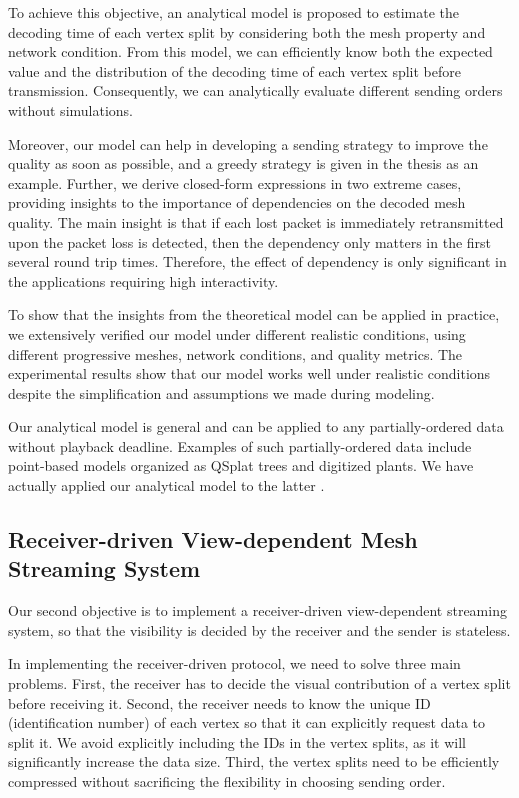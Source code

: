     To achieve this objective, an analytical model is proposed
    to estimate the decoding time of each vertex split by considering both
    the mesh property and network condition. 
    From this model, we can efficiently know both the expected 
    value and the distribution of the decoding time of each
    vertex split before transmission. Consequently, 
    we can analytically evaluate different sending orders without simulations.
    
    Moreover, our model can help in developing a sending
    strategy to improve the quality as soon as possible,
    and a greedy strategy is given in the thesis as an example. 
    Further, we derive closed-form expressions in two extreme cases,
    providing insights to the importance of dependencies on the
    decoded mesh quality. The main insight is that if each lost packet
    is immediately retransmitted upon the packet loss is detected, 
    then the dependency only matters in the first several round trip times. 
    Therefore, the effect of dependency is only significant in the applications
    requiring high interactivity. 

    To show that the insights from the theoretical model can be applied
    in practice, we extensively verified our model under different realistic conditions,
    using different progressive meshes, network conditions, and quality metrics. 
    The experimental results show that our model works well under realistic 
    conditions despite the simplification and assumptions we made during
    modeling.

    Our analytical model is general and can be applied to any 
    partially-ordered data without playback deadline.
    Examples of such partially-ordered data include point-based models 
    organized as QSplat trees \cite{rusinkiewicz:qsplat} and digitized plants.  
    We have actually applied our analytical model to the latter \cite{plant:seb}.
    
    \subsection{Receiver-driven View-dependent Mesh Streaming System}
    Our second objective is to implement a receiver-driven view-dependent streaming system,
    so that the visibility is decided by the receiver and the sender is stateless.
    
    In implementing the receiver-driven protocol, we need to solve three main problems.
    First, the receiver has to decide the visual contribution 
    of a vertex split before receiving it.
    Second, the receiver needs to know the unique ID
    (identification number) of each vertex so that it
    can explicitly request data to split it. 
    We avoid explicitly including the IDs in the vertex splits,
    as it will significantly increase the data size.
    Third, the vertex splits need to be efficiently compressed without
    sacrificing the flexibility in choosing sending order.
    

